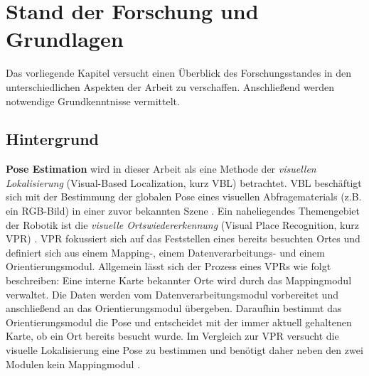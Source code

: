 
\section{Stand der Forschung und Grundlagen}
\label{sec:kapitel_2}
Das vorliegende Kapitel versucht einen Überblick des Forschungsstandes in den unterschiedlichen Aspekten der Arbeit zu verschaffen. Anschließend werden notwendige Grundkenntnisse vermittelt.

\subsection{Hintergrund}

\textbf{Pose Estimation} wird in dieser Arbeit als eine Methode der \textit{visuellen Lokalisierung} (Visual-Based Localization, kurz VBL) betrachtet. VBL beschäftigt sich mit der Bestimmung der globalen Pose eines visuellen Abfragematerials (z.B. ein RGB-Bild) in einer zuvor bekannten Szene \cite{piascoSurveyVisualBasedLocalization2018}.
Ein naheliegendes Themengebiet der Robotik ist die \textit{visuelle Ortswiedererkennung} (Visual Place Recognition, kurz VPR) \cite{lowryVisualPlaceRecognition2016}. VPR fokussiert sich auf das Feststellen eines bereits besuchten Ortes und definiert sich aus einem Mapping-, einem Datenverarbeitungs- und einem Orientierungsmodul. Allgemein lässt sich der Prozess eines VPRs wie folgt beschreiben: Eine interne Karte bekannter Orte wird durch das Mappingmodul verwaltet. Die Daten werden vom Datenverarbeitungsmodul vorbereitet und anschließend an das Orientierungsmodul übergeben. Daraufhin bestimmt das Orientierungsmodul die Pose und entscheidet mit der immer aktuell gehaltenen Karte, ob ein Ort bereits besucht wurde. Im Vergleich zur VPR versucht die visuelle Lokalisierung eine Pose zu bestimmen und benötigt daher neben den zwei Modulen kein Mappingmodul \cite{lowryVisualPlaceRecognition2016}.

